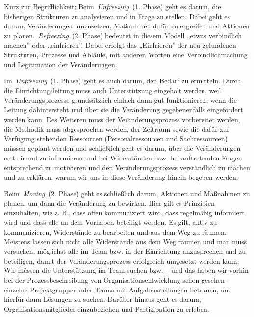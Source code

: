 \documentclass[
  letterpaper,
]{book}
\begin{document}
Kurz zur Begrifflichkeit: Beim~\emph{Unfreezing}~(1. Phase) geht es
darum, die bisherigen Strukturen zu analysieren und in Frage zu stellen.
Dabei geht es darum, Veränderungen umzusetzen, Maßnahmen dafür zu
ergreifen und Aktionen zu planen.~\emph{Refreezing}~(2. Phase) bedeutet
in diesem Modell „etwas verbindlich machen'' oder „einfrieren''. Dabei
erfolgt das „Einfrieren'' der neu gefundenen Strukturen, Prozesse und
Abläufe, mit anderen Worten eine Verbindlichmachung und Legitimation der
Veränderungen.

Im~\emph{Unfreezing}~(1. Phase) geht es auch darum, den Bedarf zu
ermitteln. Durch die Einrichtungsleitung muss auch Unterstützung
eingeholt werden, weil Veränderungsprozesse grundsätzlich einfach dann
gut funktionieren, wenn die Leitung dahintersteht und über sie die
Veränderung gegebenenfalls eingefordert werden kann. Des Weiteren muss
der Veränderungsprozess vorbereitet werden, die Methodik muss
abgesprochen werden, der Zeitraum sowie die dafür zur Verfügung
stehenden Ressourcen (Personalressourcen und Sachressourcen) müssen
geplant werden und schließlich geht es darum, über die Veränderungen
erst einmal zu informieren und bei Widerständen bzw. bei auftretenden
Fragen entsprechend zu motivieren und den Veränderungsprozess
verständlich zu machen und zu erklären, warum wir uns in diese
Veränderung hinein begeben werden.

Beim~\emph{Moving}~(2. Phase) geht es schließlich darum, Aktionen und
Maßnahmen zu planen, um dann die Veränderung zu bewirken. Hier gilt es
Prinzipien einzuhalten, wie z. B., dass offen kommuniziert wird, dass
regelmäßig informiert wird und dass alle an dem Vorhaben beteiligt
werden. Es gilt, aktiv zu kommunizieren, Widerstände zu bearbeiten und
aus dem Weg zu räumen. Meistens lassen sich nicht alle Widerstände aus
dem Weg räumen und man muss versuchen, möglichst alle im Team bzw. in
der Einrichtung anzusprechen und zu beteiligen, damit der
Veränderungsprozess erfolgreich umgesetzt werden kann. Wir müssen die
Unterstützung im Team suchen bzw. -- und das haben wir vorhin bei der
Prozessbeschreibung von Organisationsentwicklung schon gesehen --
einzelne Projektgruppen oder Teams mit Aufgabenstellungen betrauen, um
hierfür dann Lösungen zu suchen. Darüber hinaus geht es darum,
Organisationsmitglieder einzubeziehen und Partizipation zu erleben.
\end{document}
